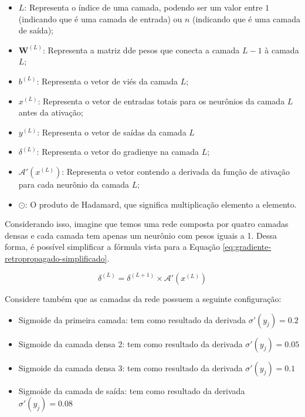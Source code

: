 \begin{itemize}
    \item $L$: Representa o índice de uma camada, podendo ser um valor entre $1$ (indicando que é uma camada de entrada) ou $n$ (indicando que é uma camada de saída);
    \item $\textbf{W}^{(L)}$: Representa a matriz dde pesos que conecta a camada $L - 1$ à camada $L$;
    \item $b^{(L)}$: Representa o vetor de viés da camada $L$;
    \item $x^{(L)}$: Representa o vetor de entradas totais para os neurônios da camada $L$ antes da ativação;
    \item $y^{(L)}$: Representa o vetor de saídas da camada $L$
    \item $\delta^{(L)}$: Representa o vetor do gradienye na camada $L$;
    \item $\mathcal{A}'(x^{(L)})$: Representa o vetor contendo a derivada da função de ativação para cada neurônio da camada $L$;
    \item $\odot$: O produto de Hadamard, que significa multiplicação elemento a elemento.
\end{itemize}

Considerando isso, imagine que temos uma rede composta por quatro camadas densas e cada camada tem apenas um neurônio com pesos iguais a 1. Dessa forma, é possível simplificar a fórmula vista para a Equação \ref{eq:gradiente-retropropagado-simplificado}.

\begin{equation}
        \delta^{(L)} =  \delta^{(L+1)} \times \mathcal{A}'(x^{(L)})
        \label{eq:gradiente-retropropagado-simplificado}
\end{equation}

Considere também que as camadas da rede possuem a seguinte configuração:

\begin{itemize}
    \item Sigmoide da primeira camada: tem como resultado da derivada $\sigma'(y_j) = 0.2$
    \item Sigmoide da camada densa 2: tem como resultado da derivada $\sigma'(y_j) = 0.05$
    \item Sigmoide da camada densa 3: tem como resultado da derivada $\sigma'(y_j) = 0.1$
    \item Sigmoide da camada de saída: tem como resultado da derivada $\sigma'(y_j) = 0.08$
\end{itemize}

